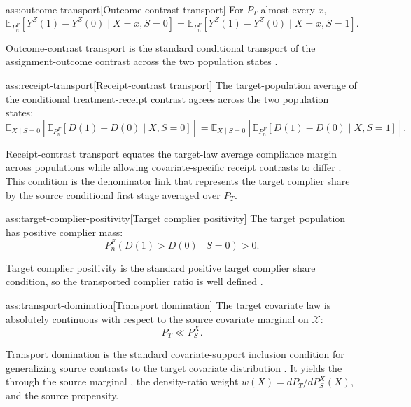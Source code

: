 \begin{assumptionv}{ass:outcome-transport}[Outcome-contrast transport]
For \(P_T\)-almost every \(x\),
\[
\mathbb E_{P_n^F}\!\left[Y^Z(1)-Y^Z(0)\mid X=x,S=0\right]
=
\mathbb E_{P_n^F}\!\left[Y^Z(1)-Y^Z(0)\mid X=x,S=1\right].
\]
\end{assumptionv}

Outcome-contrast transport is the standard conditional transport of the assignment-outcome contrast across the two population states \citep{ChenHuang2025}.

\begin{assumptionv}{ass:receipt-transport}[Receipt-contrast transport]
The target-population average of the conditional treatment-receipt contrast agrees across the two population states:
\[
\mathbb E_{X\mid S=0}\!\left[
  \mathbb E_{P_n^F}\!\left[D(1)-D(0)\mid X,S=0\right]
\right]
=
\mathbb E_{X\mid S=0}\!\left[
  \mathbb E_{P_n^F}\!\left[D(1)-D(0)\mid X,S=1\right]
\right].
\]
\end{assumptionv}

Receipt-contrast transport equates the target-law average compliance margin across populations while allowing covariate-specific receipt contrasts to differ \citep{ChenHuang2025}.  This condition is the denominator link that represents the target complier share by the source conditional first stage averaged over \(P_T\).

\begin{assumptionv}{ass:target-complier-positivity}[Target complier positivity]
The target population has positive complier mass:
\[
P_n^F\!\left(D(1)>D(0)\mid S=0\right)>0.
\]
\end{assumptionv}

Target complier positivity is the standard positive target complier share condition, so the transported complier ratio is well defined \citep{ChenHuang2025}.

\begin{assumptionv}{ass:transport-domination}[Transport domination]
The target covariate law is absolutely continuous with respect to the source covariate marginal on \(\mathcal X\):
\[
P_T\ll P_S^X.
\]
\end{assumptionv}

Transport domination is the standard covariate-support inclusion condition for generalizing source contrasts to the target covariate distribution \citep{ChenHuang2025}.  It yields the  through the source marginal , the density-ratio weight \(w(X)=dP_T/dP_S^X(X)\), and the source propensity.

